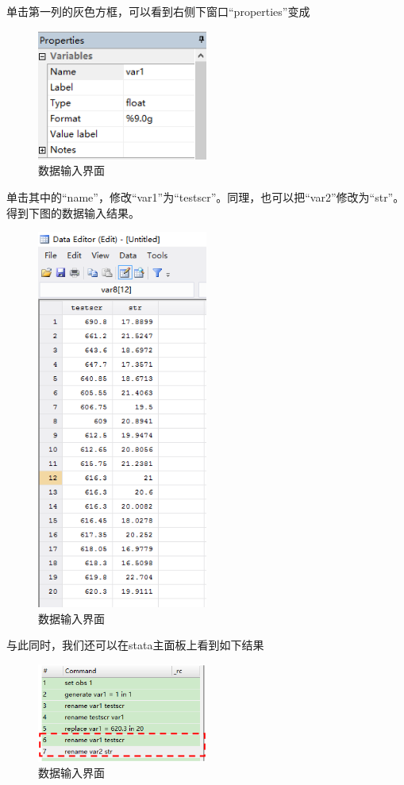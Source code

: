 \documentclass[cn,12pt,math=newtx,citestyle=gb7714-2015,bibstyle=gb7714-2015]{elegantbook}
\begin{document}
	单击第一列的灰色方框，可以看到右侧下窗口“properties”变成
	\begin{figure}[htbp]
		\centering
		\includegraphics[width=0.5\textwidth]{properties.png}
		\caption{数据输入界面}\label{fig:digit}
	\end{figure}
	
	单击其中的“name”，修改“var1”为“testscr”。同理，也可以把“var2”修改为“str”。得到下图的数据输入结果。
	\begin{figure}[htbp]
		\centering
		\includegraphics[width=0.5\textwidth]{data edit2.png}
		\caption{数据输入界面}\label{fig:digit}
	\end{figure}
	
	与此同时，我们还可以在stata主面板上看到如下结果
	\begin{figure}[htbp]
		\centering
		\includegraphics[width=0.5\textwidth]{command.png}
		\caption{数据输入界面}\label{fig:digit}
	\end{figure}
	
\end{document}
